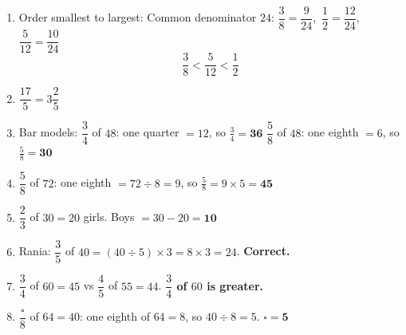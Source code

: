 \documentclass{beamer}
\begin{document}
\begin{frame}
\small
\begin{enumerate}

  \item Order smallest to largest:
  Common denominator $24$: $\dfrac{3}{8}=\dfrac{9}{24}$,\ $\dfrac{1}{2}=\dfrac{12}{24}$,\ $\dfrac{5}{12}=\dfrac{10}{24}$
  \[
    \frac{3}{8} < \frac{5}{12} < \frac{1}{2}
  \]

  \item $\dfrac{17}{5} = 3\dfrac{2}{5}$

  \item Bar models:
  \quad $\dfrac{3}{4}$ of $48$: one quarter $= 12$, so $\tfrac{3}{4} = \mathbf{36}$
  \hfill
  $\dfrac{5}{8}$ of $48$: one eighth $= 6$, so $\tfrac{5}{8} = \mathbf{30}$

  \item $\dfrac{5}{8}$ of $72$: one eighth $= 72 \div 8 = 9$, so $\tfrac{5}{8} = 9 \times 5 = \mathbf{45}$

  \item $\dfrac{2}{3}$ of $30 = 20$ girls. Boys $= 30 - 20 = \mathbf{10}$

  \item Rania: $\dfrac{3}{5}$ of $40 = (40 \div 5)\times 3 = 8\times 3 = 24$. \textbf{Correct.} \checkmark

  \item $\dfrac{3}{4}$ of $60 = 45$ \quad vs \quad $\dfrac{4}{5}$ of $55 = 44$.
  \quad \textbf{$\dfrac{3}{4}$ of $60$ is greater.}

  \item $\dfrac{\square}{8}$ of $64 = 40$: one eighth of $64 = 8$, so $40 \div 8 = 5$. \quad $\square = \mathbf{5}$

\end{enumerate}
\end{frame}
\end{document}
